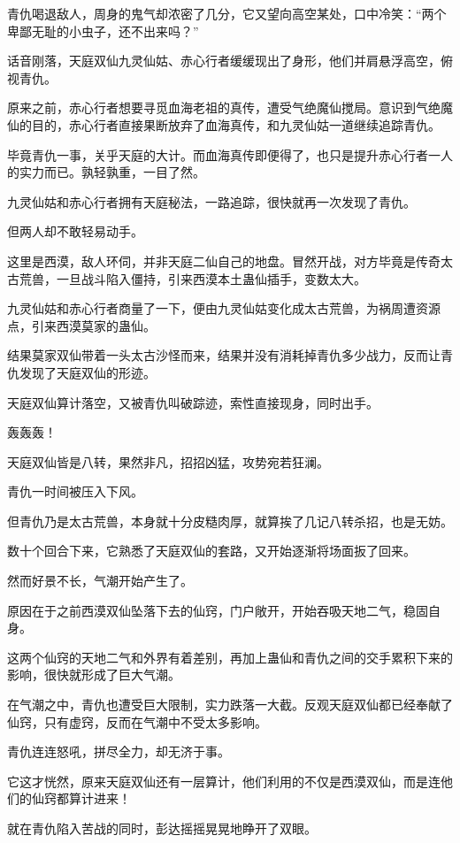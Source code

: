 \begin{this_body}
青仇喝退敌人，周身的鬼气却浓密了几分，它又望向高空某处，口中冷笑：“两个卑鄙无耻的小虫子，还不出来吗？”

话音刚落，天庭双仙九灵仙姑、赤心行者缓缓现出了身形，他们并肩悬浮高空，俯视青仇。

原来之前，赤心行者想要寻觅血海老祖的真传，遭受气绝魔仙搅局。意识到气绝魔仙的目的，赤心行者直接果断放弃了血海真传，和九灵仙姑一道继续追踪青仇。

毕竟青仇一事，关乎天庭的大计。而血海真传即便得了，也只是提升赤心行者一人的实力而已。孰轻孰重，一目了然。

九灵仙姑和赤心行者拥有天庭秘法，一路追踪，很快就再一次发现了青仇。

但两人却不敢轻易动手。

这里是西漠，敌人环伺，并非天庭二仙自己的地盘。冒然开战，对方毕竟是传奇太古荒兽，一旦战斗陷入僵持，引来西漠本土蛊仙插手，变数太大。

九灵仙姑和赤心行者商量了一下，便由九灵仙姑变化成太古荒兽，为祸周遭资源点，引来西漠莫家的蛊仙。

结果莫家双仙带着一头太古沙怪而来，结果并没有消耗掉青仇多少战力，反而让青仇发现了天庭双仙的形迹。

天庭双仙算计落空，又被青仇叫破踪迹，索性直接现身，同时出手。

轰轰轰！

天庭双仙皆是八转，果然非凡，招招凶猛，攻势宛若狂澜。

青仇一时间被压入下风。

但青仇乃是太古荒兽，本身就十分皮糙肉厚，就算挨了几记八转杀招，也是无妨。

数十个回合下来，它熟悉了天庭双仙的套路，又开始逐渐将场面扳了回来。

然而好景不长，气潮开始产生了。

原因在于之前西漠双仙坠落下去的仙窍，门户敞开，开始吞吸天地二气，稳固自身。

这两个仙窍的天地二气和外界有着差别，再加上蛊仙和青仇之间的交手累积下来的影响，很快就形成了巨大气潮。

在气潮之中，青仇也遭受巨大限制，实力跌落一大截。反观天庭双仙都已经奉献了仙窍，只有虚窍，反而在气潮中不受太多影响。

青仇连连怒吼，拼尽全力，却无济于事。

它这才恍然，原来天庭双仙还有一层算计，他们利用的不仅是西漠双仙，而是连他们的仙窍都算计进来！

就在青仇陷入苦战的同时，彭达摇摇晃晃地睁开了双眼。


\end{this_body}
